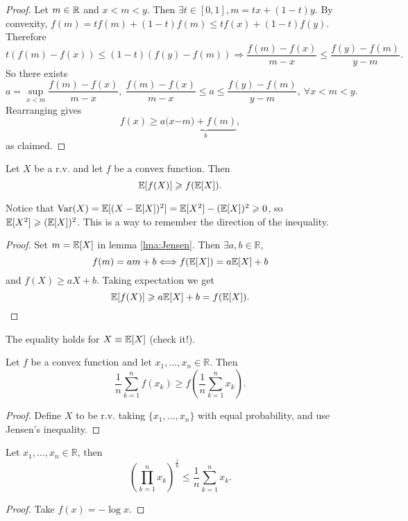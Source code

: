 \begin{proof}
    Let $m\in {\mathbb{R}}$ and $ x<m<y $. Then $ \exists t\in [0,1], m=tx+(1-t)y $. By convexity, $ f(m)=tf(m)+(1-t)f(m)\le tf(x)+(1-t)f(y) $. Therefore 
    \[
        t(f(m)-f(x))\le (1-t)(f(y)-f(m)) \Longrightarrow \frac{f(m)-f(x)}{m-x}\le \frac{f(y)-f(m)}{y-m}.
    \]
    So there exists
    \[
        a= \sup_{x<m} \frac{f(m)-f(x)}{m-x},  \ \frac{f(m)-f(x)}{m-x}\le a\le \frac{f(y)-f(m)}{y-m},\ \forall x<m<y.
    \]
    Rearranging gives 
    \[
        f(x)\ge a(x \underbrace{-m)+f(m)}_{b},
    \]
    as claimed.
\end{proof}
\begin{proposition}\label{prop:Jensen's inequality}
    Let $X$ be a r.v. and let $f$ be a convex function. Then 
    \[
        {\mathbb{E}}[f(X)]\geqslant f({\mathbb{E}}[X]).
    \]
\end{proposition}
\begin{note}
    Notice that $ \operatorname{Var}(X)={\mathbb{E}}[(X-{\mathbb{E}}[X])^2]={\mathbb{E}}[X^2]-({\mathbb{E}}[X])^2\geqslant 0 $, so $ {\mathbb{E}}[X^2]\geqslant ({\mathbb{E}}[X])^2 $. This is a way to remember the direction of the inequality.
\end{note}
\begin{proof}
    Set $ m={\mathbb{E}}[X] $ in lemma \ref{lma:Jensen}. Then $ \exists a,b\in \mathbb{R} $, 
    \[
        f(m)=am+b \Longleftrightarrow f({\mathbb{E}}[X])=a{\mathbb{E}}[X]+b
    \]
    and $ f(X)\ge aX+b $. Taking expectation we get 
    \[
        {\mathbb{E}}[f(X)]\geqslant a{\mathbb{E}}[X]+b=f({\mathbb{E}}[X]).\qedhere
    \]
\end{proof}
\begin{remark}
    The equality holds for $ X\equiv {\mathbb{E}}[X] $ (check it!).
\end{remark}
\begin{corollary}
    Let $f$ be a convex function and let $ x_1,\dots,x_n\in \mathbb{R}  $. Then 
    \[
        \frac{1}{n}\sum_{k=1}^{n} f(x_k)\ge f\left( \frac{1}{n}\sum_{k=1}^{n}x_k \right).
    \]
\end{corollary}
\begin{proof}
    Define $X$ to be r.v. taking $ \{x_1,\dots,x_n\} $ with equal probability, and use Jensen's inequality.
\end{proof}
\begin{corollary}[AM-GM inequality]\label{prop:AM-GM inequality}
    Let $ x_1,\dots,x_n\in \mathbb{R}  $, then 
    \[
        \left( \prod_{k=1}^{n} x_k\right)^{\frac1n}\le \frac{1}{n}\sum_{k=1}^{n}x_k.
    \]
\end{corollary}
\begin{proof}
    Take $f(x)=-\log x$.
\end{proof}
